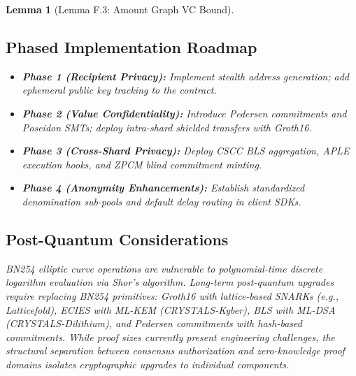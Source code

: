 \documentclass[journal,10pt,twocolumn]{IEEEtran}
\newtheorem{lemma}[theorem]{Lemma}
\theoremstyle{definition}
\theoremstyle{remark}
\begin{document}
\begin{lemma}[Lemma F.3: Amount Graph VC Bound]
\subsection{Phased Implementation Roadmap}
\begin{itemize}[leftmargin=*]
    \item \textbf{Phase 1 (Recipient Privacy):} Implement stealth address generation; add ephemeral public key tracking to the contract.
    \item \textbf{Phase 2 (Value Confidentiality):} Introduce Pedersen commitments and Poseidon SMTs; deploy intra-shard shielded transfers with Groth16.
    \item \textbf{Phase 3 (Cross-Shard Privacy):} Deploy CSCC BLS aggregation, APLE execution hooks, and ZPCM blind commitment minting.
    \item \textbf{Phase 4 (Anonymity Enhancements):} Establish standardized denomination sub-pools and default delay routing in client SDKs.
\end{itemize}

\subsection{Post-Quantum Considerations}
BN254 elliptic curve operations are vulnerable to polynomial-time discrete logarithm evaluation via Shor's algorithm. Long-term post-quantum upgrades require replacing BN254 primitives: Groth16 with lattice-based SNARKs (e.g., Latticefold), ECIES with ML-KEM (CRYSTALS-Kyber), BLS with ML-DSA (CRYSTALS-Dilithium), and Pedersen commitments with hash-based commitments. While proof sizes currently present engineering challenges, the structural separation between consensus authorization and zero-knowledge proof domains isolates cryptographic upgrades to individual components.


\end{lemma}
\end{document}
